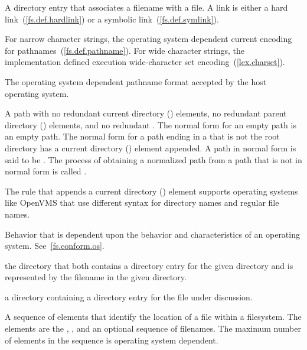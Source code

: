 A directory entry  that associates a
filename with a file. A link is either a hard link~(\ref{fs.def.hardlink}) or a
symbolic link~(\ref{fs.def.symlink}).

For narrow character strings, the operating system dependent current encoding
for pathnames~(\ref{fs.def.pathname}). For wide character strings, the implementation defined execution
wide-character set encoding~(\ref{lex.charset}).

The operating system dependent pathname format accepted by the host operating system.

A path with no redundant current directory () elements,
no redundant parent directory () elements, and
no redundant .
The normal form for an empty path is an empty path.
The normal form for a path ending in a 
that is not the root directory
has a current directory () element appended.
A path in normal form is said to be .
The process of obtaining a normalized path
from a path that is not in normal form is called .
\begin{note} The rule that appends a current directory () element
supports operating systems like OpenVMS
that use different syntax for directory names and regular file names.
\end{note}

Behavior that is dependent upon the behavior
and characteristics of an operating system. See~\ref{fs.conform.os}.

 the directory that both contains a
directory entry for the given directory and is represented by the filename
 in the given directory.

 a directory containing a directory
entry for the file under discussion.

A sequence of elements that identify
the location of a file within a filesystem.
The elements are the
,
,
and an optional sequence of filenames.
The maximum number of elements in the sequence is operating system dependent.

